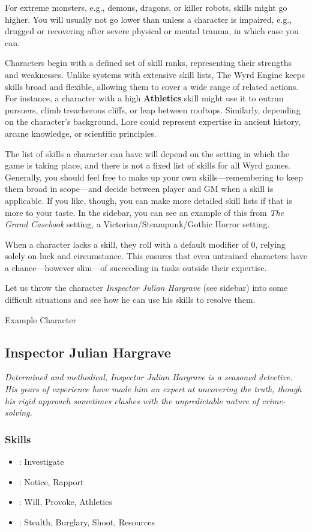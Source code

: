 For extreme monsters, e.g., demons, dragons, or killer robots, skills might go higher. You will usually not go lower than \Untrained unless a character is impaired, e.g., drugged or recovering after severe physical or mental trauma, in which case you can.


Characters begin with a defined set of skill ranks, representing their strengths and weaknesses. Unlike systems with extensive skill lists, The Wyrd Engine keeps skills broad and flexible, allowing them to cover a wide range of related actions. For instance, a character with a high \textbf{Athletics} skill might use it to outrun pursuers, climb treacherous cliffs, or leap between rooftops. Similarly, depending on the character's background, Lore could represent expertise in ancient history, arcane knowledge, or scientific principles.

The list of skills a character can have will depend on the setting in which the game is taking place, and there is not a fixed list of skills for all Wyrd games. Generally, you should feel free to make up your own skills---remembering to keep them broad in scope---and decide between player and GM when a skill is applicable. If you like, though, you can make more detailed skill lists if that is more to your taste. In the sidebar, you can see an example of this from \emph{The Grand Casebook} setting, a Victorian/Steampunk/Gothic Horror setting.

When a character lacks a skill, they roll with a default modifier of 0, relying solely on luck and circumstance. This ensures that even untrained characters have a chance—however slim—of succeeding in tasks outside their expertise.

Let us throw the character \emph{Inspector Julian Hargrave} (see sidebar) into some difficult situations and see how he can use his skills to resolve them.

\begin{DndSidebar}[float=!t]{Example Character}
\subsection{Inspector Julian Hargrave}
	\emph{Determined and methodical, Inspector Julian Hargrave is a seasoned detective. His years of experience have made him an expert at uncovering the truth, though his rigid approach sometimes clashes with the unpredictable nature of crime-solving.}
	\subsubsection*{Skills}
	\begin{itemize}
    	\item \Expert: Investigate
	    \item \Skilled: Notice, Rapport
    	\item \Novice: Will, Provoke, Athletics
	    \item \Untrained: Stealth, Burglary, Shoot, Resources
	\end{itemize}
\end{DndSidebar}

